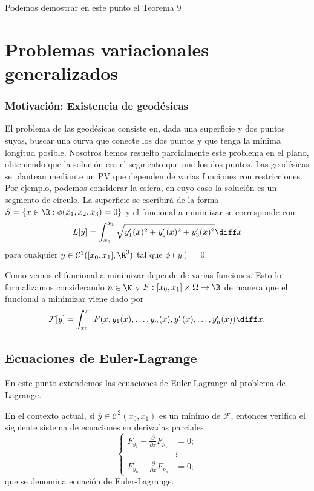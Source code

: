 \documentclass{article}
\begin{document}
Podemos demostrar en este punto el Teorema 9

\section{Problemas variacionales generalizados}

\subsubsection{Motivación: Existencia de geodésicas}

El problema de las geodésicas consiste en, dada una superficie y dos puntos suyos, buscar una curva
que conecte los dos puntos y que tenga la mínima longitud posible. Nosotros hemos resuelto
parcialmente este problema en el plano, obteniendo que la solución era el segmento que une los dos
puntos. Las geodésicas se plantean mediante un PV que dependen de varias funciones con
restricciones. Por ejemplo, podemos considerar la esfera, en cuyo caso la solución es un segmento de
círculo. La superficie se escribirá de la forma $S = \{x \in \R: \phi(x_1, x_2, x_3) = 0\}$ y el
funcional a minimizar se corresponde con
\[L[y] = \int_{x_0}^{x_1} \sqrt{y_1'(x)^2 + y_2'(x)^2 +y_3'(x)^2} \diff x\] para cualquier
$y \in \mathcal{C}^1([x_0, x_1], \R^3)$ tal que $\phi(y) = 0$.

Como vemos el funcional a minimizar depende de varias funciones. Esto lo formalizamos considerando
$n \in \N$ y $F : [x_0, x_1] \times \Omega \to \R$ de manera que el funcional a minimizar viene dado
por
\[\mathcal{F}[y] = \int_{x_0}^{x_1} F(x, y_1(x), \ldots, y_n(x), y_1'(x), \ldots, y_n'(x)) \diff
  x.\]

\subsection{Ecuaciones de Euler-Lagrange}

En este punto extendemos las ecuaciones de Euler-Lagrange al problema de Lagrange.

\begin{thm}
  En el contexto actual, si $\overline{y} \in \mathcal{C}^2(x_0, x_1)$ es un mínimo de
  $\mathcal{F}$, entonces verifica el siguiente sistema de ecuaciones en derivadas parciales
  \[
    \begin{cases}
      F_{y_1} - \frac{\partial}{\partial x} F_{p_1} & = 0;\\
      & \vdots \\
      F_{y_n} - \frac{\partial}{\partial x} F_{p_n} & =  0;
    \end{cases}
  \]
  que se denomina ecuación de Euler-Lagrange.
\end{thm}
\end{document}
